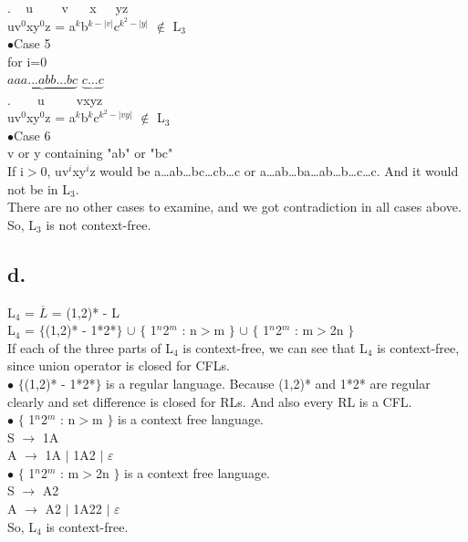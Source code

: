 \documentclass[12pt]{article}
\begin{document}
.$\hspace{14pt}$u$\hspace{27pt}$v$\hspace{20pt}$x$\hspace{18pt}$yz \\
uv$^0$xy$^0$z = a$^k$b$^{k-|v|}$c$^{k^2 - |y|}$ $\notin$ L$_3$ \\
$\bullet$Case 5 \\
for i=0 \\
$\underbrace{aaa...abb...bc}$ $\underbrace{c...c}$ \\
.$\hspace{25pt}$u$\hspace{30pt}$vxyz \\
uv$^0$xy$^0$z = a$^k$b$^k$c$^{k^2 - |vy|}$ $\notin$ L$_3$ \\
$\bullet$Case 6 \\
v or y containing "ab" or "bc" \\
If i$>$0, uv$^i$xy$^i$z would be a…ab…bc…cb…c or a…ab…ba…ab…b…c…c. And it would not be in L$_3$. \\
There are no other cases to examine, and we got contradiction in all cases above. \\
So, L$_3$ is not context-free. \\

\subsection*{d.}
L$_4$ = $\overline{L}$ = (1,2)* - L  \\
L$_4$ = $\lbrace$(1,2)* - 1*2*$\rbrace$ $\cup$ $\lbrace$ 1$^n$2$^m$ : n$>$m $\rbrace$ $\cup$ $\lbrace$ 1$^n$2$^m$ : m$>$2n $\rbrace$ \\
If each of the three parts of L$_4$ is context-free, we can see that L$_4$ is context-free, since union operator is closed for CFLs. \\
$\bullet$ $\lbrace$(1,2)* - 1*2*$\rbrace$ is a regular language. Because (1,2)* and 1*2* are regular clearly and set difference is closed for RLs. And also every RL is a CFL. \\
$\bullet$ $\lbrace$ 1$^n$2$^m$ : n$>$m $\rbrace$ is a context free language. \\
S $\rightarrow$ 1A \\
A $\rightarrow$ 1A $\vert$ 1A2 $\vert$ $\varepsilon$ \\
$\bullet$ $\lbrace$ 1$^n$2$^m$ : m$>$2n $\rbrace$ is a context free language. \\
S $\rightarrow$ A2 \\
A $\rightarrow$ A2 $\vert$ 1A22 $\vert$ $\varepsilon$ \\
So, L$_4$ is context-free. \\
\end{document}
